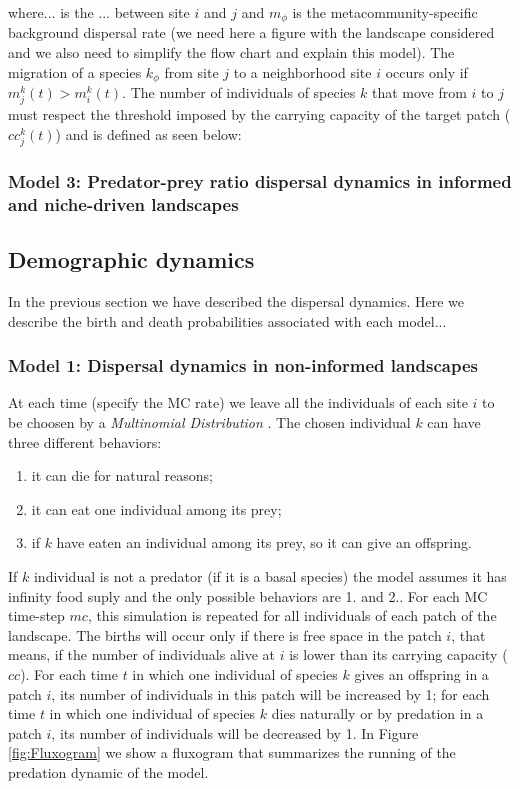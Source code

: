 where... is the ... between site $i$ and $j$ and $m_{\mathcal{\phi}}$
is the metacommunity-specific background dispersal rate (we need here
a figure with the landscape considered and we also need to simplify
the flow chart and explain this model). The migration of a species
$k_{\mathcal{\phi}}$ from site $j$ to a neighborhood site $i$ occurs
only if $m_{j}^k(t) > m_{i}^k(t)$. The number of individuals of
species $k$ that move from $i$ to $j$ must respect the threshold
imposed by the carrying capacity of the target patch ($cc_j^k(t)$) and
is defined as seen below:

\subsubsection{Model 3: Predator-prey ratio dispersal dynamics in informed and niche-driven landscapes}



\subsection{Demographic dynamics}

In the previous section we have described the dispersal dynamics. Here
we describe the birth and death probabilities associated with each model...

\subsubsection{Model 1: Dispersal dynamics in non-informed landscapes}

At each time (specify the MC rate) we leave all the individuals of
each site $i$ to be choosen by a \emph{Multinomial Distribution}
\cite{levin1981representation}. The chosen individual $k$ can have
three different behaviors:
\begin{enumerate}
\item it can die for natural reasons;
\item it can eat one individual among its prey; 
\item if $k$ have eaten an individual among its prey, so it can give an offspring. 
\end{enumerate}
If $k$ individual is not a predator (if it is a basal species) the
model assumes it has infinity food suply and the only possible
behaviors are 1. and 2.. For each MC time-step $mc$, this simulation
is repeated for all individuals of each patch of the landscape. The
births will occur only if there is free space in the patch $i$, that
means, if the number of individuals alive at $i$ is lower than its
carrying capacity ($cc$). For each time $t$ in which one individual of
species $k$ gives an offspring in a patch $i$, its number of
individuals in this patch will be increased by 1; for each time $t$ in
which one individual of species $k$ dies naturally or by predation in
a patch $i$, its number of individuals will be decreased by 1. In
Figure \ref{fig:Fluxogram} we show a fluxogram that summarizes the
running of the predation dynamic of the model.

